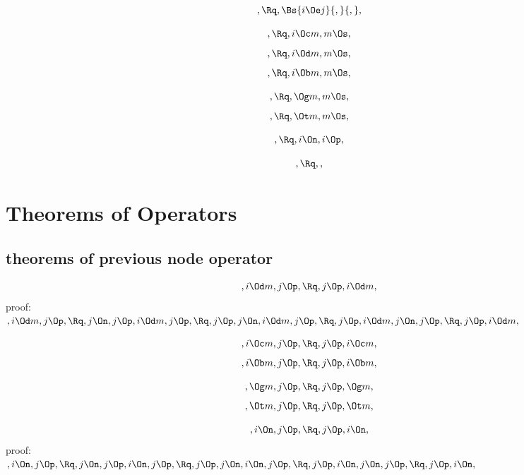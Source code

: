 \[, \Rq , \Bs{i \Oe j}{,}{,} ,\]

\[, \Rq ,i \Oc m ,m \Os,\]
\[, \Rq ,i \Od m ,m \Os,\]
\[, \Rq ,i \Ob m ,m \Os,\]

\[, \Rq ,\Og m ,m \Os,\]
\[, \Rq ,\Ot m ,m \Os,\]


\[, \Rq ,i \On ,i \Op,\]

\[, \Rq , ,\]

\newpage
\section{Theorems of Operators}


\subsection{theorems of previous node operator}

\[,i \Od m, j \Op, \Rq , j \Op, i \Od m,\]
\bigskip
proof:\\
\begin{math} 
,i \Od m, j \Op, \\\\
\Rq, j \On, j \Op,i \Od m, j \Op, \\\\
\Rq, j \Op, j \On,i \Od m, j \Op, \\\\
\Rq, j \Op,i \Od m, j \On, j \Op, \\\\
\Rq, j \Op,i \Od m,
\end{math}
\bigskip

\[,i \Oc m, j \Op, \Rq , j \Op, i \Oc m,\]
\[,i \Ob m, j \Op, \Rq , j \Op, i \Ob m,\]

\[, \Og m, j \Op, \Rq , j \Op,  \Og m,\]
\[, \Ot m, j \Op, \Rq , j \Op,  \Ot m,\]

\[,i \On, j \Op, \Rq , j \Op, i \On,\]
\bigskip
proof:\\
\begin{math} 
,i \On, j \Op, \\\\
\Rq, j \On, j \Op, i \On, j \Op, \\\\
\Rq, j \Op, j \On, i \On, j \Op, \\\\
\Rq, j \Op, i \On, j \On, j \Op, \\\\
\Rq, j \Op, i \On,
\end{math}
\bigskip

